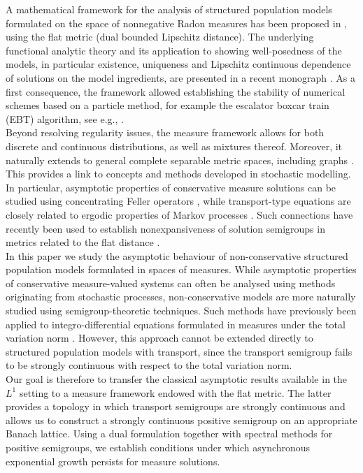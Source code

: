 \documentclass[12pt,a4paper]{amsart}
\begin{document}
A mathematical framework for the analysis of structured population models formulated on the space of nonnegative Radon measures has been proposed in \cite{GLMC}, using the flat metric (dual bounded Lipschitz distance). The underlying functional analytic theory and its application to showing well-posedness of the models, in particular existence, uniqueness and Lipschitz continuous dependence of solutions on the model ingredients, are presented  in a recent monograph \cite{Duell_book}. As a first consequence, the framework allowed  establishing the stability of numerical schemes based on a particle method, for example the escalator boxcar train (EBT) algorithm, see e.g., \cite{EBT,CGU,GJMCU}.\\
Beyond resolving regularity issues, the measure framework allows for both discrete and continuous distributions, as well as mixtures thereof. Moreover, it naturally extends to general complete separable metric spaces, including graphs \cite{M3AS_measures}. This provides a link to concepts and methods developed in stochastic modelling. In particular, asymptotic properties of conservative measure solutions can be studied using concentrating Feller operators \cite{MR2287895,MR2271485,MR2995659,Thieme_2022}, while transport-type equations are closely related to ergodic properties of Markov processes \cite{MR2857021}. Such connections have recently been used to establish nonexpansiveness of solution semigroups in metrics related to the flat distance \cite{FournierPerthame2,FournierPerthame1}.\\
In this paper we study the asymptotic behaviour of non-conservative structured population models formulated in spaces of measures. While asymptotic properties of conservative measure-valued systems can often be analysed using methods originating from stochastic processes, non-conservative models are more naturally studied using semigroup-theoretic techniques. Such methods have previously been applied to integro-differential equations formulated in measures under the total variation norm \cite{BuergerBomze,MischlerScher}. However, this approach cannot be extended directly to structured population models with transport, since the transport semigroup fails to be strongly continuous with respect to the total variation norm.\\
Our goal is therefore to transfer the classical asymptotic results available in the $L^1$ setting to a measure framework endowed with the flat metric. 
The latter provides a topology in which transport semigroups are strongly continuous and allows us to construct a strongly continuous positive semigroup on an appropriate Banach lattice. Using a dual formulation together with spectral methods for positive semigroups, we establish conditions under which asynchronous exponential growth persists for measure solutions.\\
\end{document}
